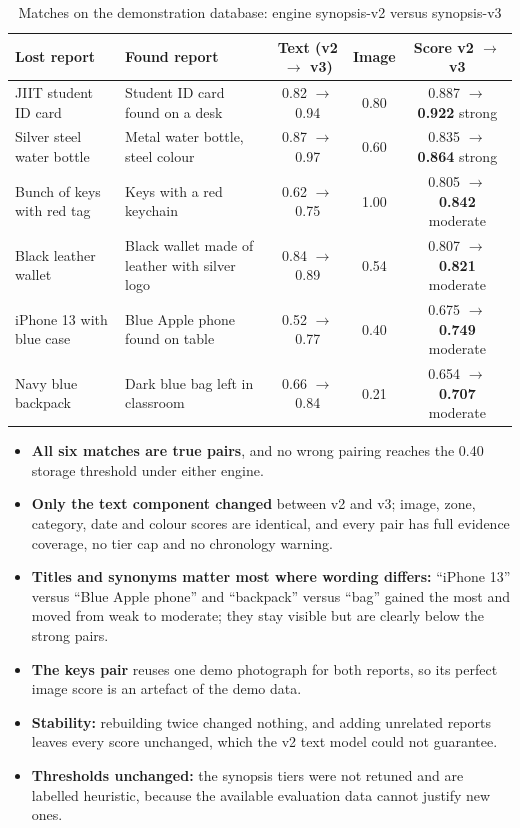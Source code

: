 \documentclass[12pt,a4paper,oneside]{report}
\begin{document}
\begin{table}[H]
\centering\small
\caption[Matches on the demonstration database]{Matches on the demonstration database: engine synopsis-v2 versus synopsis-v3}
\label{tab:live}
\begin{tabularx}{\textwidth}{X X ccc}
\toprule
Lost report & Found report & Text (v2 $\rightarrow$ v3) & Image & Score v2 $\rightarrow$ v3\\
\midrule
JIIT student ID card & Student ID card found on a desk & 0.82 $\rightarrow$ 0.94 & 0.80 & 0.887 $\rightarrow$ \textbf{0.922} strong\\
Silver steel water bottle & Metal water bottle, steel colour & 0.87 $\rightarrow$ 0.97 & 0.60 & 0.835 $\rightarrow$ \textbf{0.864} strong\\
Bunch of keys with red tag & Keys with a red keychain & 0.62 $\rightarrow$ 0.75 & 1.00 & 0.805 $\rightarrow$ \textbf{0.842} moderate\\
Black leather wallet & Black wallet made of leather with silver logo & 0.84 $\rightarrow$ 0.89 & 0.54 & 0.807 $\rightarrow$ \textbf{0.821} moderate\\
iPhone 13 with blue case & Blue Apple phone found on table & 0.52 $\rightarrow$ 0.77 & 0.40 & 0.675 $\rightarrow$ \textbf{0.749} moderate\\
Navy blue backpack & Dark blue bag left in classroom & 0.66 $\rightarrow$ 0.84 & 0.21 & 0.654 $\rightarrow$ \textbf{0.707} moderate\\
\bottomrule
\end{tabularx}
\end{table}

\begin{itemize}
  \item \textbf{All six matches are true pairs}, and no wrong pairing reaches the 0.40 storage threshold under either engine.
  \item \textbf{Only the text component changed} between v2 and v3; image, zone, category, date and colour scores are identical, and every pair has full evidence coverage, no tier cap and no chronology warning.
  \item \textbf{Titles and synonyms matter most where wording differs:} ``iPhone 13'' versus ``Blue Apple phone'' and ``backpack'' versus ``bag'' gained the most and moved from weak to moderate; they stay visible but are clearly below the strong pairs.
  \item \textbf{The keys pair} reuses one demo photograph for both reports, so its perfect image score is an artefact of the demo data.
  \item \textbf{Stability:} rebuilding twice changed nothing, and adding unrelated reports leaves every score unchanged, which the v2 text model could not guarantee.
  \item \textbf{Thresholds unchanged:} the synopsis tiers were not retuned and are labelled heuristic, because the available evaluation data cannot justify new ones.
\end{itemize}
\end{document}
